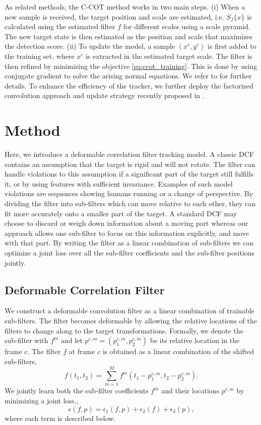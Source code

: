 \documentclass[runningheads,a4paper]{llncs}
\begin{document}
As related methods, the C-COT method works in two main steps. (i) When a new sample is received, the target position and scale are estimated, i.e. $S_f\{x\}$ is calculated using the estimated filter $f$ for different scales using a scale pyramid. The new target state is then estimated as the position and scale that maximizes the detection score. (ii) To update the model, a sample $(x^c,y^c)$ is first added to the training set, where $x^c$ is extracted in the estimated target scale. The filter is then refined by minimizing the objective \eqref{eq:ccot_training}. This is done by using conjugate gradient to solve the arising normal equations. We refer to \cite{DanelljanECCV2016} for further details. To enhance the efficiency of the tracker, we further deploy the factorized convolution approach and update strategy recently proposed in \cite{DanelljanCVPR2017}.

\section{Method}

Here, we introduce a deformable correlation filter tracking model. A classic DCF contains an assumption that the target is rigid and will not rotate. The filter can handle violations to this assumption if a significant part of the target still fulfills it, or by using features with sufficient invariance. Examples of such model violations are sequences showing humans running or a change of perspective. By dividing the filter into sub-filters which can move relative to each other, they can fit more accurately onto a smaller part of the target. A standard DCF may choose to discard or weigh down information about a moving part whereas our approach allows one sub-filter to focus on this information explicitly, and move with that part. By writing the filter as a linear combination of sub-filters we can optimize a joint loss over all the sub-filter coefficients and the sub-filter positions jointly.

\subsection{Deformable Correlation Filter}
We construct a deformable convolution filter as a linear combination of trainable sub-filters. The filter becomes deformable by allowing the relative locations of the filters to change along to the target transformations. Formally, we denote the sub-filter with $f^m$ and let $p^{c,m}=(p_1^{c,m},p_2^{c,m})$ be its relative location in the frame $c$. The filter $f$ at frame $c$ is obtained as a linear combination of the shifted sub-filters,
\begin{equation}
	\label{eq:def_filter}
  f(t_1,t_2) = \sum_{m=1}^M f^m(t_1-p_1^{c,m},t_2-p_2^{c,m}).
\end{equation}
We jointly learn both the sub-filter coefficients $f^m$ and their locations $p^{c,m}$ by minimizing a joint loss.,
\begin{equation}
  \label{lossdeform}
  \epsilon(f,p) = \epsilon_1(f,p) + \epsilon_2(f) + \epsilon_3(p),
\end{equation}
where each term is described below.
\end{document}
